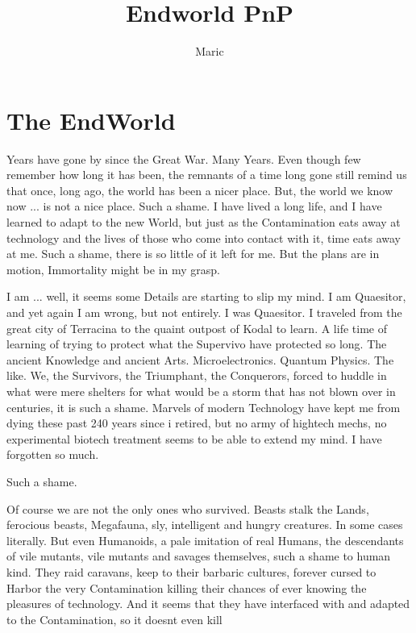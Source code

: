 \documentclass{article}
\title{Endworld PnP}
\author{Maric}
\date{}
\begin{document}
    \maketitle
    \tableofcontents
    \section{The EndWorld}

    Years have gone by since the Great War. Many Years. Even though few remember how long it has been, the remnants
    of a time long gone still remind us that once, long ago, the world has been a nicer place. But, the world we know
    now ... is not a nice place. Such a shame. I have lived a long life, and I have learned to adapt to the new World,
    but just as the Contamination eats away at technology and the lives of those who come into contact with it, time
    eats away at me. Such a shame, there is so little of it left for me. But the plans are in motion, Immortality might
    be in my grasp.\par
    I am ... well, it seems some Details are starting to slip my mind. I am Quaesitor, and yet again I am wrong, but
    not entirely. I was Quaesitor. I traveled from the great city of Terracina to the quaint outpost of Kodal to
    learn. A life time of learning of trying to protect what the Supervivo have protected so long. The ancient Knowledge
    and ancient Arts. Microelectronics. Quantum Physics. The like. We, the Survivors, the Triumphant, the Conquerors,
    forced to huddle in what were mere shelters for what would be a storm that has not blown over in centuries, it is such
    a shame. Marvels of modern Technology have kept me from dying these past 240 years since i retired, but no army of
    hightech mechs, no experimental biotech treatment seems to be able to extend my mind. I have forgotten so much.
    \par Such a shame.\par
    Of course we are not the only ones who survived. Beasts stalk the Lands, ferocious beasts, Megafauna, sly, intelligent
    and hungry creatures. In some cases literally. But even Humanoids, a pale imitation of real Humans, the descendants
    of vile mutants, vile mutants and savages themselves, such a shame to human kind. They raid caravans, keep to their
    barbaric cultures, forever cursed to Harbor the very Contamination killing their chances of ever knowing the pleasures
    of technology. And it seems that they have interfaced with and adapted to the Contamination, so it doesnt even kill
\end{document}
